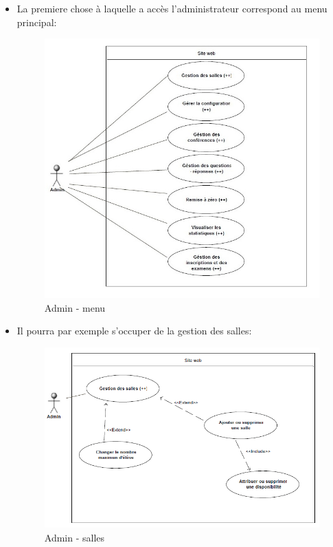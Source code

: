 \begin{itemize}
\item La premiere chose à laquelle a accès l'administrateur correspond au menu principal:
 \begin{figure}[h]
        \begin{center}
            \includegraphics[scale=0.45]{images/Admin - menu1.jpg} 
        \end{center}
        \caption{Admin - menu}
        \label{Admin - menu}
    \end{figure}
\newpage

\item Il pourra par exemple s'occuper de la gestion des salles:
 \begin{figure}[h]
  \begin{center}
            \includegraphics[scale=0.50]{images/Admin - salles.png} 
        \end{center}
        \caption{Admin - salles }
        \label{Admin - salles}
    \end{figure}
\end{itemize}
\newpage
 
